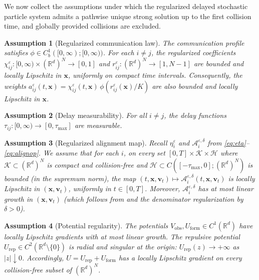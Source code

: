 \documentclass[pdflatex,sn-mathphys-num]{sn-jnl}%
\numberwithin{equation}{section}
\theoremstyle{thmstyleone}%
\newtheorem{assumption}{Assumption}
\theoremstyle{remark}
\theoremstyle{definition}
\newcommand{\R}{\mathbb{R}}
\begin{document}
We now collect the assumptions under which the regularized delayed
stochastic particle system admits a pathwise unique strong solution up to
the first collision time, and globally provided collisions are excluded.
\begin{assumption}[Regularized communication law]\label{ass:net}
The communication profile satisfies
$\phi\in C_b^1([0,\infty);[0,\infty))$. For each $i\neq j$, the regularized
coefficients $\chi_{ij}^{\varepsilon}:[0,\infty)\times(\R^d)^N\to[0,1]$ and
$r_{ij}^{\varepsilon}:(\R^d)^N\to[1,N-1]$ are bounded and locally Lipschitz
in $\mathbf{x}$, uniformly on compact time intervals. Consequently, the weights
$a_{ij}^{\varepsilon}(t,\mathbf{x}) = \chi_{ij}^{\varepsilon}(t,\mathbf{x})\,
\phi(r_{ij}^{\varepsilon}(\mathbf{x})/K)$ are also bounded and locally Lipschitz
in $\mathbf{x}$.
\end{assumption}
\begin{assumption}[Delay measurability]\label{ass:delay}
For all $i\neq j$, the delay functions
$\tau_{ij}:[0,\infty)\to[0,\tau_{\max}]$ are measurable.
\end{assumption}
\begin{assumption}[Regularized alignment map]\label{ass:align}
Recall $\eta_i^\varepsilon$ and $\mathcal A_i^{\varepsilon,\delta}$ from
\eqref{eq:eta}--\eqref{eq:alignop}. We assume that for each $i$, on every
set $[0,T]\times\mathcal K\times\mathcal H$ where
$\mathcal K\subset(\R^d)^N$ is compact and collision-free and
$\mathcal H\subset C([-\tau_{\max},0];(\R^d)^N)$ is bounded (in the
supremum norm), the map $(t,\mathbf{x},\mathbf{v}_t)\mapsto
\mathcal A_i^{\varepsilon,\delta}(t,\mathbf{x},\mathbf{v}_t)$ is locally Lipschitz in
$(\mathbf{x},\mathbf{v}_t)$, uniformly in $t\in[0,T]$. Moreover,
$\mathcal A_i^{\varepsilon,\delta}$ has at most linear growth in
$(\mathbf{x},\mathbf{v}_t)$ (which follows from  and the denominator
regularization by $\delta>0$).
\end{assumption}
\begin{assumption}[Potential regularity]\label{ass:pot}
The potentials $V_{\mathrm{obs}}, U_{\mathrm{form}} \in C^1(\R^d)$ have
locally Lipschitz gradients with at most linear growth. The repulsive
potential $U_{\mathrm{rep}}\in C^2(\R^d\setminus\{0\})$ is radial and
singular at the origin: $U_{\mathrm{rep}}(z)\to+\infty$ as $|z|\downarrow 0$.
Accordingly, $U = U_{\mathrm{rep}} + U_{\mathrm{form}}$ has a locally
Lipschitz gradient on every collision-free subset of $(\R^d)^N$.
\end{assumption}
\end{document}
